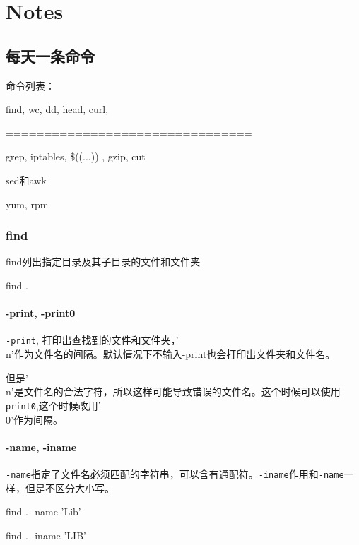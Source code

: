\chapter{Notes}

\section{每天一条命令}
命令列表：


find, wc, dd, head, curl,



================================



grep, iptables, \$((...)) ,  gzip, cut

sed和awk

yum, rpm




\subsection{find}

find列出指定目录及其子目录的文件和文件夹

\begin{Bash}[查找当前目录及子目录的文件和文件夹]
find .
\end{Bash}


\subsubsection{-print, -print0}
\lstinline$-print$, 打印出查找到的文件和文件夹，'\\n'作为文件名的间隔。默认情况下不输入-print也会打印出文件夹和文件名。

但是'\\n'是文件名的合法字符，所以这样可能导致错误的文件名。这个时候可以使用\lstinline$-print0$,这个时候改用'\\0'作为间隔。

\subsubsection{-name, -iname}

\lstinline$-name$指定了文件名必须匹配的字符串，可以含有通配符。\lstinline$-iname$作用和\lstinline$-name$一样，但是不区分大小写。

\begin{Bash}[名字匹配指定的字符串]

find . -name 'Lib'

find . -iname 'LIB'

\end{Bash}


